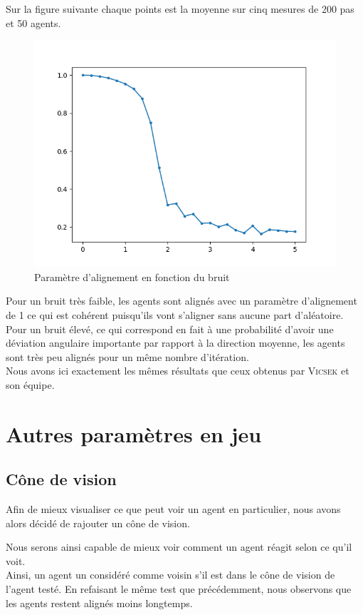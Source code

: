 \documentclass[french, a4paper, 12pt, openany]{report}
\begin{document}
	Sur la figure suivante chaque points est la moyenne sur cinq mesures de 200 pas et 50 agents.
	\begin{figure}[!h]
		\centering
		\includegraphics[width=12cm]{images/bruit_4.png}
		\caption{Paramètre d'alignement en fonction du bruit}
	\end{figure}
	
	Pour un bruit très faible, les agents sont alignés avec un paramètre d'alignement de 1 ce qui est cohérent puisqu'ils vont s'aligner sans aucune part d'aléatoire. Pour un bruit élevé, ce qui correspond en fait à une probabilité d'avoir une déviation angulaire importante par rapport à la direction moyenne, les agents sont très peu alignés pour un même nombre d'itération. \\
	
	Nous avons ici exactement les mêmes résultats que ceux obtenus par \textsc{Vicsek} et son équipe.

\section{Autres paramètres en jeu}
	\subsection{Cône de vision}
	
		Afin de mieux visualiser ce que peut voir un agent en particulier, nous avons alors décidé de rajouter un cône de vision.
		
		Nous serons ainsi capable de mieux voir comment un agent réagit selon ce qu'il voit. \\
		
		Ainsi, un agent un considéré comme voisin s'il est dans le cône de vision de l'agent testé. En refaisant le même test que précédemment, nous observons que les agents restent alignés moins longtemps.
		
\end{document}
